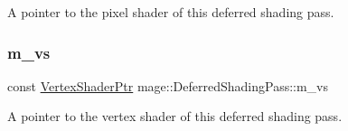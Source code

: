 A pointer to the pixel shader of this deferred shading pass. \hypertarget{classmage_1_1_deferred_shading_pass_aabaa6fd24ccef9c8db07898a182231e0}{}\label{classmage_1_1_deferred_shading_pass_aabaa6fd24ccef9c8db07898a182231e0} 
\subsubsection{\texorpdfstring{m\+\_\+vs}{m\_vs}}
{\footnotesize\ttfamily const \hyperlink{namespacemage_a1f19b094f771e30bc0a6c1cebcc0dd58}{Vertex\+Shader\+Ptr} mage\+::\+Deferred\+Shading\+Pass\+::m\+\_\+vs\hspace{0.3cm}{\ttfamily [private]}}

A pointer to the vertex shader of this deferred shading pass. 